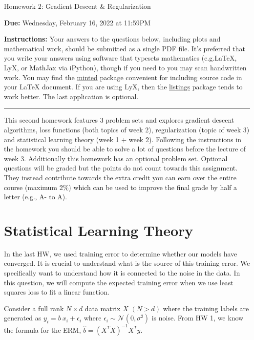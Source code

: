 \documentclass{article}
\newcommand{\ruleskip}{\bigskip\hrule\bigskip}
\begin{document}

\pagestyle{myheadings} 

\begin{center}
{\Large
Homework 2: Gradient Descent \& Regularization
} 
\end{center}

{
{ \color{nyupurple} \textbf{Due:} Wednesday, February 16, 2022 at 11:59PM} 
} 

\textbf{Instructions: }Your answers to the questions below, including plots and mathematical
 work, should be submitted as a single PDF file.  It's preferred that you write your answers using software that typesets mathematics (e.g.LaTeX, LyX, or MathJax via iPython), though if you need to you may scan handwritten work.  You may find the \href{https://github.com/gpoore/minted}{minted} package convenient for including source code in your LaTeX document.  If you are using LyX, then the \href{https://en.wikibooks.org/wiki/LaTeX/Source_Code_Listings}{listings} package tends to work better. The last application is optional.

\ruleskip

This second homework features 3 problem sets and explores gradient descent algorithms, loss functions (both topics of week 2), regularization (topic of week 3) and statistical learning theory (week 1 + week 2). Following the instructions in the homework you should be able to solve a lot of questions before the lecture of week 3. Additionally this homework has an optional problem set. Optional questions will be graded but the points do not count towards this assignment. They instead contribute towards the extra credit you can earn over the entire course (maximum 2\%) which can be used to improve the final grade by half a letter (e.g., A- to A). 

\section{\large Statistical Learning Theory}
In the last HW, we used training error to determine whether our models have converged. It is crucial to understand what is the source of this training error. We specifically want to understand how it is connected to the noise in the data. In this question, we will compute the expected training error when we use least squares loss to fit a linear function. 

Consider a full rank $N \times d$ data matrix $X$ $(N > d)$ where the training labels are generated as $y_i = b \: x_i + \epsilon_i$ where $\epsilon_i \sim \mathcal{N}(0, \sigma^2)$ is noise. From HW 1, we know the formula for the ERM, $\hat{b} = (X^TX)^{-1}X^Ty$.
\end{document}
